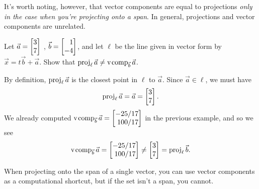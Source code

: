 It's worth noting, however, that vector components are equal to projections \emph{only in the case when you're
projecting onto a span}. In general, projections and vector components are unrelated. 

\begin{example}
	Let $\vec a=\mat{3\\7}$ , $\vec b=\mat{1\\-4}$, and let $\ell$ be the line given in vector form by
	$\vec x=t\vec b+\vec a$. Show that $\operatorname{proj}_\ell\vec a\neq \operatorname{v\hspace{1pt}comp}_{\vec b}\vec a$.

	By definition, $\operatorname{proj}_{\ell}\vec a$ is the closest point in $\ell$ to $\vec a$. Since $\vec a\in\ell$, we must
	have 	
	\[
	    \Proj_{\ell}\vec a = \vec a = \mat{3\\7}.
	\]
	We already computed $\Vcomp_{\vec b}\vec a=\mat{-25/17\\100/17}$ in the previous example, and so we see
	\[
		\Vcomp_{\vec b}\vec a=\mat{-25/17\\100/17}\neq \mat{3\\7}=\Proj_{\ell}\vec b.
	\]
\end{example}

\begin{emphbox}[Takeaway]
	When projecting onto the span of a single vector, you can use vector components as a computational shortcut, 
	but if the set isn't a span, you cannot.
\end{emphbox}

